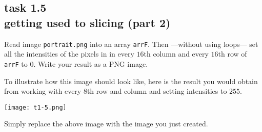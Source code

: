 
\subsection*{task 1.5 \\[1ex] getting used to slicing (part 2)}

Read image \texttt{portrait.png} into an array \texttt{arrF}. Then ---without using  loops--- set all the intensities of the pixels in in every $16$th column and every $16$th row of \texttt{arrF} to $0$. Write your result as a PNG image.

To illustrate how this image should look like, here is the result you would obtain from working with every $8$th row and column and setting intensities to $255$.
\begin{center}
\texttt{[image: t1-5.png]} 
\end{center}
Simply replace the above image with the image you just created.






